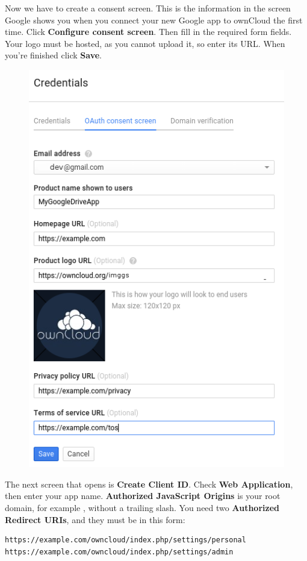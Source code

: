 \documentclass[letterpaper,10pt,english]{sphinxmanual}
\begin{document}
Now we have to create a consent screen. This is the information in the screen
Google shows you when you connect your new Google app to ownCloud the first
time. Click \textbf{Configure consent screen}. Then fill in the required form fields.
Your logo must be hosted, as you cannot upload it, so enter its URL. When
you're finished click \textbf{Save}.
\begin{figure}[htbp]
\centering

\includegraphics{google-drive8.png}
\end{figure}

The next screen that opens is \textbf{Create Client ID}. Check \textbf{Web Application},
then enter your app name. \textbf{Authorized JavaScript Origins} is your root domain,
for example , without a trailing slash. You need two
\textbf{Authorized Redirect URIs}, and they must be in this form:

\begin{Verbatim}[commandchars=\\\{\}]
https://example.com/owncloud/index.php/settings/personal
https://example.com/owncloud/index.php/settings/admin
\end{Verbatim}
\end{document}

